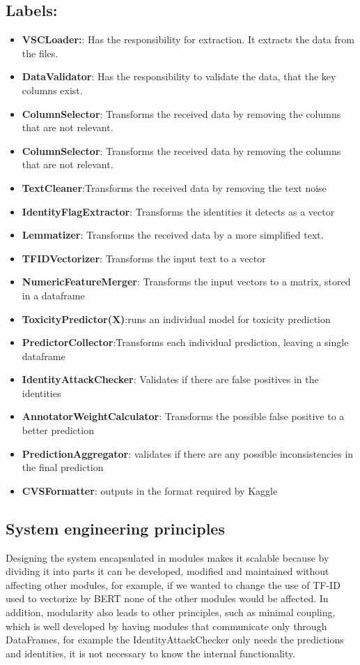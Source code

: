 \documentclass[conference]{IEEEtran}
\begin{document}
\subsection{Labels:}

\begin{itemize}
\item \textbf{VSCLoader:}: Has the responsibility for extraction. It extracts the data from the files.
\item \textbf{DataValidator}: Has the responsibility to validate the data, that the key columns exist.
\item \textbf{ColumnSelector}: Transforms the received data by removing the columns that are not relevant.
\item \textbf{ColumnSelector}: Transforms the received data by removing the columns that are not relevant.
\item \textbf{TextCleaner}:Transforms the received data by removing the text noise
\item \textbf{IdentityFlagExtractor}: Transforms the identities it detects as a vector
\item \textbf{Lemmatizer}: Transforms the received data by a more simplified text.
\item \textbf{TFIDVectorizer}: Transforms the input text to a vector
\item \textbf{NumericFeatureMerger}: Transforms the input vectors to a matrix, stored in a dataframe
\item \textbf{ToxicityPredictor(X)}:runs an individual model for toxicity prediction
\item \textbf{PredictorCollector}:Transforms each individual prediction, leaving a single dataframe 
\item \textbf{IdentityAttackChecker}: Validates if there are false positives in the identities
\item \textbf{AnnotatorWeightCalculator}: Transforms the possible false positive to a better prediction
\item \textbf{PredictionAggregator}: validates if there are any possible inconsistencies in the final prediction
\item \textbf{CVSFormatter}: outputs in the format required by Kaggle
\end{itemize}
\subsection{System engineering principles}
Designing the system encapsulated in modules makes it scalable because by dividing it into parts it can be developed, modified and maintained without affecting other modules, for example, if we wanted to change the use of TF-ID used to vectorize by BERT none of the other modules would be affected. In addition, modularity also leads to other principles, such as minimal coupling, which is well developed by having modules that communicate only through DataFrames, for example the IdentityAttackChecker only needs the predictions and identities, it is not necessary to know the internal functionality.
\end{document}
